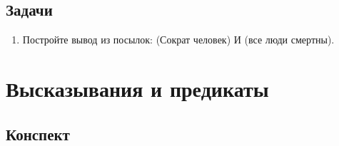 \subsection*{Задачи}
\begin{enumerate}
\item Постройте вывод из посылок: (Сократ человек) И (все люди смертны).
\end{enumerate}


\section{Высказывания и предикаты}

\subsection*{Конспект}
